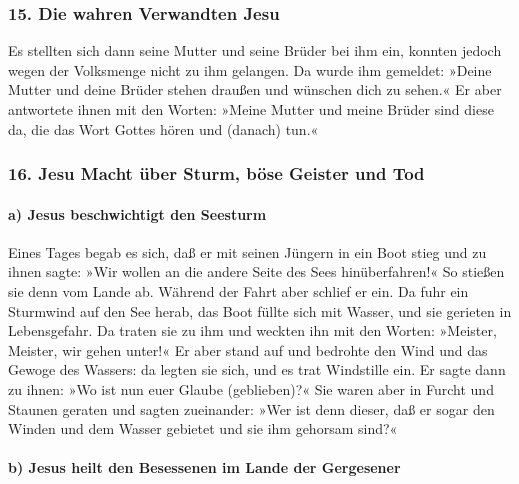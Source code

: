 \hypertarget{die-wahren-verwandten-jesu}{%
\subsubsection{15. Die wahren Verwandten
Jesu}\label{die-wahren-verwandten-jesu}}

 Es stellten sich dann seine Mutter und seine Brüder bei
ihm ein, konnten jedoch wegen der Volksmenge nicht zu ihm gelangen.
 Da wurde ihm gemeldet: »Deine Mutter und deine Brüder
stehen draußen und wünschen dich zu sehen.«  Er aber
antwortete ihnen mit den Worten: »Meine Mutter und meine Brüder sind
diese da, die das Wort Gottes hören und (danach) tun.«

\hypertarget{jesu-macht-uxfcber-sturm-buxf6se-geister-und-tod}{%
\subsubsection{16. Jesu Macht über Sturm, böse Geister und
Tod}\label{jesu-macht-uxfcber-sturm-buxf6se-geister-und-tod}}

\hypertarget{a-jesus-beschwichtigt-den-seesturm}{%
\paragraph{a) Jesus beschwichtigt den
Seesturm}\label{a-jesus-beschwichtigt-den-seesturm}}

 Eines Tages begab es sich, daß er mit seinen Jüngern in
ein Boot stieg und zu ihnen sagte: »Wir wollen an die andere Seite des
Sees hinüberfahren!« So stießen sie denn vom Lande ab. 
Während der Fahrt aber schlief er ein. Da fuhr ein Sturmwind auf den See
herab, das Boot füllte sich mit Wasser, und sie gerieten in
Lebensgefahr.  Da traten sie zu ihm und weckten ihn mit
den Worten: »Meister, Meister, wir gehen unter!« Er aber stand auf und
bedrohte den Wind und das Gewoge des Wassers: da legten sie sich, und es
trat Windstille ein.  Er sagte dann zu ihnen: »Wo ist nun
euer Glaube (geblieben)?« Sie waren aber in Furcht und Staunen geraten
und sagten zueinander: »Wer ist denn dieser, daß er sogar den Winden und
dem Wasser gebietet und sie ihm gehorsam sind?«

\hypertarget{b-jesus-heilt-den-besessenen-im-lande-der-gergesener}{%
\paragraph{b) Jesus heilt den Besessenen im Lande der
Gergesener}\label{b-jesus-heilt-den-besessenen-im-lande-der-gergesener}}

